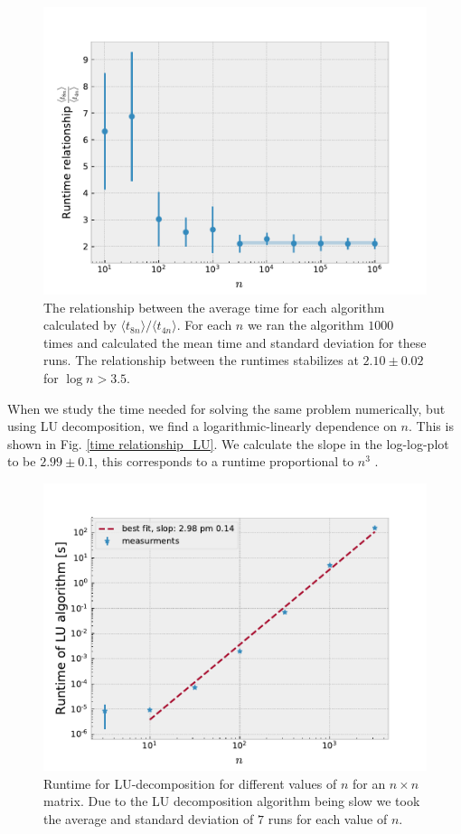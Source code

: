 \documentclass[%
 reprint,
nofootinbib,
 amsmath,amssymb,
 aps,
]{revtex4-1}
\begin{document}
\begin{figure}
\centering
\includegraphics[scale=0.5]{../figures/time_difference.pdf}
\caption{The relationship between the average time for each algorithm calculated by $\langle t_{8n} \rangle /\langle t_{4n} \rangle$. For each $n$ we ran the algorithm $1000$ times and calculated the mean time and standard deviation for these runs. The relationship between the runtimes stabilizes at $2.10\pm0.02$ for $\log n > 3.5$.}
\label{time relationship}
\end{figure}

When we study the time needed for solving the same problem numerically, but using LU decomposition, we find a logarithmic-linearly dependence on $n$. This is shown in Fig. \vref{time relationship_LU}.
We calculate the slope in the log-log-plot to be $2.99\pm0.1$, this corresponds to a runtime proportional to $n^3$ \cite{hjorten}.

\begin{figure}
\centering
\includegraphics[scale=0.5]{../figures/time_difference_LU.pdf}
\caption{Runtime for LU-decomposition for different values of $n$ for an $n\times n$ matrix. Due to the LU decomposition algorithm being slow we took the average and standard deviation of $7$ runs for each value of $n$.}
\label{time relationship_LU}
\end{figure}
\end{document}
